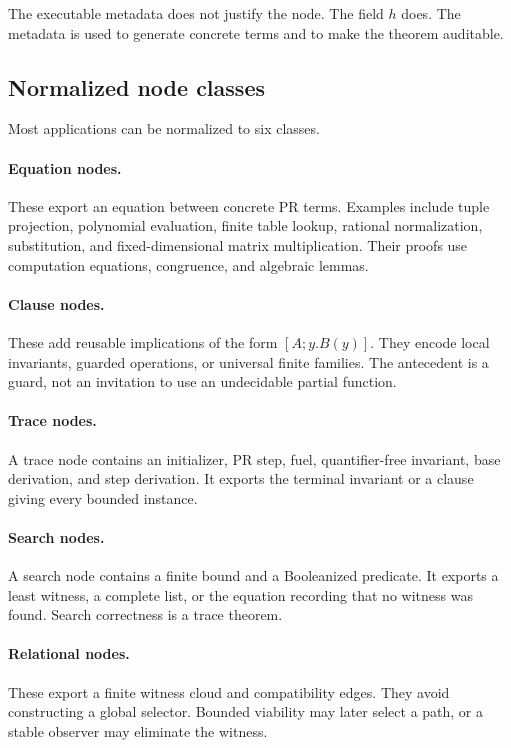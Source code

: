 The executable metadata does not justify the node.  The field \(h\) does.  The
metadata is used to generate concrete terms and to make the theorem auditable.

\subsection{Normalized node classes}

Most applications can be normalized to six classes.

\paragraph{Equation nodes.}
These export an equation between concrete PR terms.  Examples include tuple
projection, polynomial evaluation, finite table lookup, rational normalization,
substitution, and fixed-dimensional matrix multiplication.  Their proofs use
computation equations, congruence, and algebraic lemmas.

\paragraph{Clause nodes.}
These add reusable implications of the form \([A;y.B(y)]\).  They encode local
invariants, guarded operations, or universal finite families.  The antecedent
is a guard, not an invitation to use an undecidable partial function.

\paragraph{Trace nodes.}
A trace node contains an initializer, PR step, fuel, quantifier-free invariant,
base derivation, and step derivation.  It exports the terminal invariant or a
clause giving every bounded instance.

\paragraph{Search nodes.}
A search node contains a finite bound and a Booleanized predicate.  It exports a
least witness, a complete list, or the equation recording that no witness was
found.  Search correctness is a trace theorem.

\paragraph{Relational nodes.}
These export a finite witness cloud and compatibility edges.  They avoid
constructing a global selector.  Bounded viability may later select a path, or
a stable observer may eliminate the witness.


